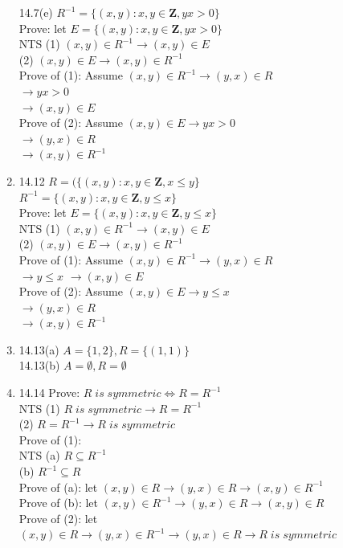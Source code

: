 \documentclass[12pt]{article}
\begin{document}
\begin{enumerate}
14.7(e)  $R^{-1}=\{(x,y):x,y \in \mathbf{Z}, yx > 0\}$\\
Prove: let $E=\{(x,y):x,y \in \mathbf{Z}, yx > 0\}$\\
NTS (1) $(x,y) \in R^{-1} \longrightarrow  (x,y) \in E$\\
(2) $(x,y) \in E \longrightarrow (x,y) \in R^{-1}$\\
Prove of (1): Assume $(x,y) \in R^{-1} \longrightarrow (y,x) \in R$\\
$\longrightarrow yx > 0$\\
$\longrightarrow (x,y) \in E$\\
Prove of (2): Assume $(x,y) \in E \longrightarrow yx > 0$\\
$\longrightarrow (y,x) \in R$\\
$\longrightarrow (x,y) \in R^{-1}$\\

\item 14.12 $R=(\{(x,y):x,y \in \mathbf{Z}, x \leq y\}$\\
$R^{-1}= \{(x,y):x,y \in \mathbf{Z}, y \leq x\}$\\
Prove: let $E=\{(x,y):x,y \in \mathbf{Z}, y \leq x\}$\\
NTS (1) $(x,y) \in R^{-1} \longrightarrow  (x,y) \in E$\\
(2) $(x,y) \in E \longrightarrow (x,y) \in R^{-1}$\\
Prove of (1): Assume $(x,y) \in R^{-1} \longrightarrow (y,x) \in R$\\
$\longrightarrow y \leq x$
$\longrightarrow (x,y) \in E$\\
Prove of (2): Assume $(x,y) \in E \longrightarrow y \leq x$\\
$\longrightarrow (y,x) \in R$\\
$\longrightarrow (x,y) \in R^{-1}$\\

\item 14.13(a) $A=\{1,2\},R=\{(1,1)\}$\\
14.13(b) $A=\emptyset, R=\emptyset$

\item 14.14 Prove: $R  \; is \; symmetric \Longleftrightarrow R=R^{-1}$\\
NTS (1) $R \;  is \; symmetric \longrightarrow R=R^{-1}$\\
(2) $R=R^{-1} \longrightarrow R \;  is \; symmetric$\\
Prove of (1):\\
NTS (a) $R \subseteq R^{-1}$\\
(b) $R^{-1} \subseteq R$\\
Prove of (a): let $(x,y) \in R \longrightarrow (y,x) \in R \longrightarrow (x,y) \in R^{-1}$\\
Prove of (b): let $(x,y) \in R^{-1} \longrightarrow (y,x) \in R \longrightarrow (x,y) \in R$\\
\vspace{0.05in}
Prove of (2): let $(x,y) \in R \longrightarrow (y,x) \in R^{-1} \longrightarrow (y,x) \in R \longrightarrow R \;  is \; symmetric$\\


\end{enumerate}
\end{document}
